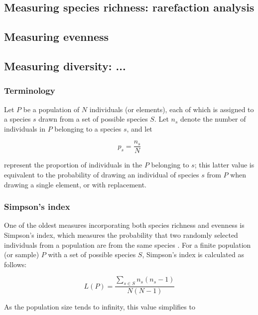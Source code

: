\subsection{Measuring species richness: rarefaction analysis}

\subsection{Measuring evenness}

\subsection{Measuring diversity: ...}

\subsubsection{Terminology}

Let $P$ be a population of $N$ individuals (or elements), each of which is assigned to a species $s$ drawn from a set of possible species $S$. Let $n_s$ denote the number of individuals in $P$ belonging to a species $s$, and let 

\begin{equation}
p_s = \frac{n_s}{N}
\label{eq:species_proportion}
\end{equation}

represent the proportion of individuals in the $P$ belonging to $s$; this latter value is equivalent to the probability of drawing an individual of species $s$ from $P$ when drawing a single element, or with replacement. 

\subsubsection{Simpson's index}

One of the oldest measures incorporating both species richness and evenness is Simpson's index, which measures the probability that two randomly selected individuals from a population are from the same species \citep{simpson1949diversity}. For a finite population (or sample) $P$ with a set of possible species $S$, Simpson's index is calculated as follows:

\begin{equation}
L(P) = \frac{\sum_{s \in S} n_s(n_s-1)}{N(N-1)}
\label{eq:simpson_finite}
\end{equation} 

As the population size tends to infinity, this value simplifies to

